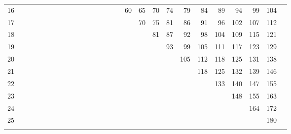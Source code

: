 \begin{table}[H]
{\begin{tabular}[t]{*{27}{r}}
16 &  &  &  &  &  &  &  &  &  &  &  &  &  &  &  & 60 & 65 & 70 & 74 & 79 & 84 & 89 & 94 & 99 & 104\\
17 &  &  &  &  &  &  &  &  &  &  &  &  &  &  &  &  & 70 & 75 & 81 & 86 & 91 & 96 & 102 & 107 & 112\\
18 &  &  &  &  &  &  &  &  &  &  &  &  &  &  &  &  &  & 81 & 87 & 92 & 98 & 104 & 109 & 115 & 121\\
19 &  &  &  &  &  &  &  &  &  &  &  &  &  &  &  &  &  &  & 93 & 99 & 105 & 111 & 117 & 123 & 129\\
20 &  &  &  &  &  &  &  &  &  &  &  &  &  &  &  &  &  &  &  & 105 & 112 & 118 & 125 & 131 & 138\\
21 &  &  &  &  &  &  &  &  &  &  &  &  &  &  &  &  &  &  &  &  & 118 & 125 & 132 & 139 & 146\\
22 &  &  &  &  &  &  &  &  &  &  &  &  &  &  &  &  &  &  &  &  &  & 133 & 140 & 147 & 155\\
23 &  &  &  &  &  &  &  &  &  &  &  &  &  &  &  &  &  &  &  &  &  &  & 148 & 155 & 163\\
24 &  &  &  &  &  &  &  &  &  &  &  &  &  &  &  &  &  &  &  &  &  &  &  & 164 & 172\\
25 &  &  &  &  &  &  &  &  &  &  &  &  &  &  &  &  &  &  &  &  &  &  &  &  & 180\\
\lspbottomrule
\end{tabular}}
\end{table}


